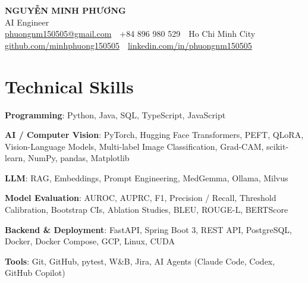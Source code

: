 \documentclass[10pt, a4paper]{article}
\newcommand{\skillrow}[2]{\textbf{#1}: #2\par}
\begin{document}
\color{BodyText}

\begin{center}
  {\fontsize{21pt}{25pt}\selectfont\bfseries\color{NavyBlue} NGUYỄN MINH PHƯƠNG}\\[3pt]
  {\fontsize{12.5pt}{15pt}\selectfont\color{MutedText} AI Engineer }\\[4pt]
  {\footnotesize
  \href{mailto:phuongnm150505@gmail.com}{phuongnm150505@gmail.com}
  \,\textbar\, +84 896 980 529
  \,\textbar\, Ho Chi Minh City
  \,\textbar\, \href{https://github.com/minhphuong150505}{github.com/minhphuong150505}
  \,\textbar\, \href{https://www.linkedin.com/in/phuongnm150505/}{linkedin.com/in/phuongnm150505}}
\end{center}
\vspace{-6pt}

\section{Technical Skills}
\skillrow{Programming}{Python, Java, SQL, TypeScript, JavaScript}
\skillrow{AI / Computer Vision}{PyTorch, Hugging Face Transformers, PEFT, QLoRA, Vision-Language Models, Multi-label Image Classification, Grad-CAM, scikit-learn, NumPy, pandas, Matplotlib}
\skillrow{LLM}{RAG, Embeddings, Prompt Engineering, MedGemma, Ollama, Milvus}
\skillrow{Model Evaluation}{AUROC, AUPRC, F1, Precision / Recall, Threshold Calibration, Bootstrap CIs, Ablation Studies, BLEU, ROUGE-L, BERTScore}
\skillrow{Backend \& Deployment}{FastAPI, Spring Boot 3, REST API, PostgreSQL, Docker, Docker Compose, GCP, Linux, CUDA}
\skillrow{Tools}{Git, GitHub, pytest, W\&B, Jira, AI Agents (Claude Code, Codex, GitHub Copilot)}

\end{document}
